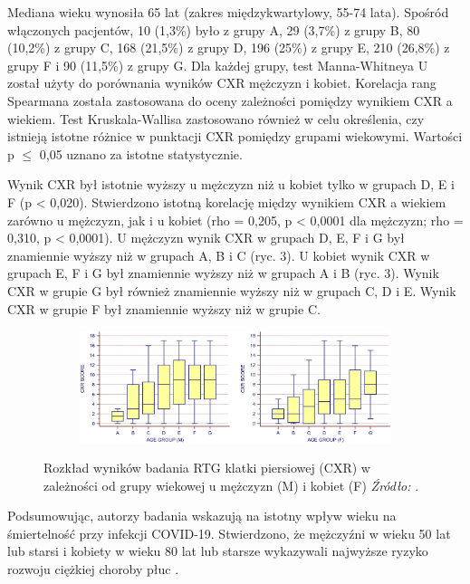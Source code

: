 \documentclass[polish, twoside, 12pt, a4paper]{article}
\theoremstyle{definition}
\theoremstyle{plain}
\theoremstyle{remark}
\begin{document}
Mediana wieku wynosiła 65 lat (zakres międzykwartylowy, 55-74 lata). Spośród włączonych pacjentów, 10 (1,3\%) było z grupy A, 29 (3,7\%) z grupy B, 80 (10,2\%) z grupy C, 168 (21,5\%) z grupy D, 196 (25\%) z grupy E, 210 (26,8\%) z grupy F i 90 (11,5\%) z grupy G. Dla każdej grupy, test Manna-Whitneya U został użyty do porównania wyników CXR mężczyzn i kobiet. Korelacja rang Spearmana została zastosowana do oceny zależności pomiędzy wynikiem CXR a wiekiem. Test Kruskala-Wallisa zastosowano również w celu określenia, czy istnieją istotne różnice w punktacji CXR pomiędzy grupami wiekowymi. Wartości p $\leq$ 0,05 uznano za istotne statystycznie.

Wynik CXR był istotnie wyższy u mężczyzn niż u kobiet tylko w grupach D, E i F (p < 0,020). Stwierdzono istotną korelację między wynikiem CXR a wiekiem zarówno u mężczyzn, jak i u kobiet (rho = 0,205, p < 0,0001 dla mężczyzn; rho = 0,310, p < 0,0001). U mężczyzn wynik CXR w grupach D, E, F i G był znamiennie wyższy niż w grupach A, B i C (ryc. 3). U kobiet wynik CXR w grupach E, F i G był znamiennie wyższy niż w grupach A i B (ryc. 3). Wynik CXR w grupie G był również znamiennie wyższy niż w grupach C, D i E. Wynik CXR w grupie F był znamiennie wyższy niż w grupie C.


\begin{figure}[hbt]
  \centering

  \begin{subfigure}[t]{\textwidth}
    \includegraphics[width=15cm]{age-sex.jpg}
  \end{subfigure}

  \captionsetup{margin=10pt,font=small,labelfont=bf,width=.8\textwidth}

  \caption{Rozkład wyników badania RTG klatki piersiowej (CXR) w zależności od grupy wiekowej u mężczyzn (M) i kobiet (F) \textit{Źródło:} \cite{wang2020}.}\label{fig:xxx2}
\end{figure}

Podsumowując, autorzy badania wskazują na istotny wpływ wieku na śmiertelność przy infekcji COVID-19. Stwierdzono, że mężczyźni w wieku 50 lat lub starsi i kobiety w wieku 80 lat lub starsze wykazywali najwyższe ryzyko rozwoju ciężkiej choroby płuc \cite{wang2020}.
\end{document}
